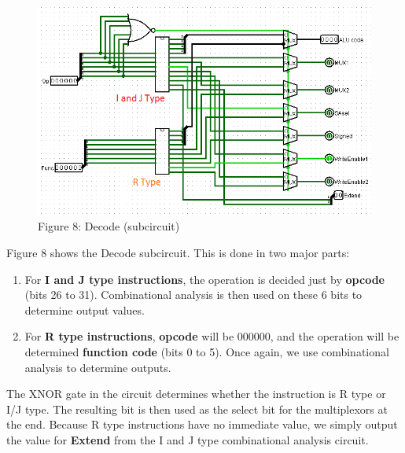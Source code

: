\documentclass{article}
\begin{document}
\begin{figure}
\vspace{-1cm}
\begin{center}
\includegraphics[scale=0.7]{Decoder.png} \\
Figure 8: Decode (subcircuit)
\end{center}
\vspace{-1.3cm}
\end{figure}
\noindent Figure 8 shows the Decode subcircuit. This is done in two major parts:
\begin{enumerate}
\item
For \textbf{I and J type instructions}, the operation is decided just by \textbf{opcode} (bits 26 to 31). Combinational analysis is then used on these 6 bits to determine output values.

\item
For \textbf{R type instructions}, \textbf{opcode} will be 000000, and the operation will be determined \textbf{function code} (bits 0 to 5). Once again, we use combinational analysis to determine outputs.
\end{enumerate}
The XNOR gate in the circuit determines whether the instruction is R type or I/J type. The resulting bit is then used as the select bit for the multiplexors at the end. Because R type instructions have no immediate value, we simply output the value for \textbf{Extend} from the I and J type combinational analysis circuit.
\end{document}
